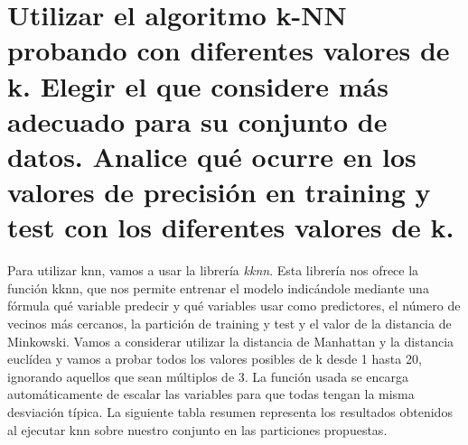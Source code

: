 \documentclass[a4paper,12pt, oneside]{book}
\begin{document}
\section[k-NN para clasificación.]{Utilizar el algoritmo k-NN probando con diferentes valores de k. Elegir el que considere más adecuado para su conjunto de datos. Analice qué ocurre en los valores de precisión en training y test con los diferentes valores de k.}

Para utilizar knn, vamos a usar la librería \textit{kknn}. Esta librería nos ofrece la función kknn, que nos permite entrenar el modelo indicándole mediante una fórmula qué variable predecir y qué variables usar como predictores, el número de vecinos más cercanos, la partición de training y test y el valor de la distancia de Minkowski. Vamos a considerar utilizar la distancia de Manhattan y la distancia euclídea y vamos a probar todos los valores posibles de k desde 1 hasta 20, ignorando aquellos que sean múltiplos de 3. La función usada se encarga automáticamente de escalar las variables para que todas tengan la misma desviación típica. La siguiente tabla resumen representa los resultados obtenidos al ejecutar knn sobre nuestro conjunto en las particiones propuestas.\\
\end{document}
